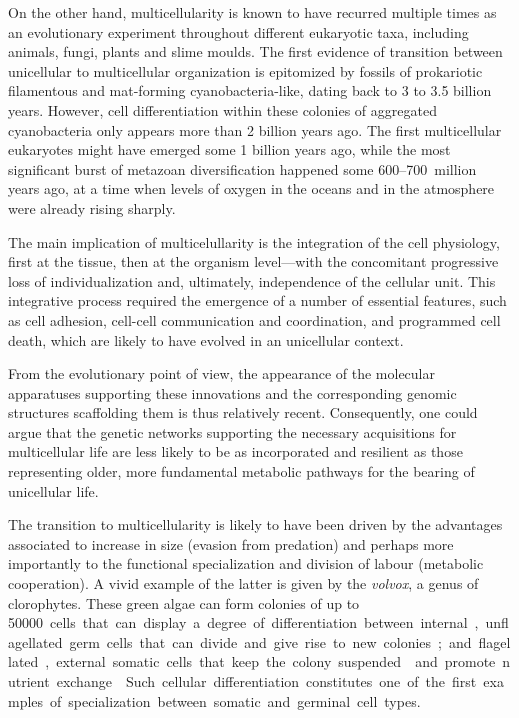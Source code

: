 \documentclass{tufte-book}
\begin{document}

On the other hand, multicellularity is known to have recurred multiple times as
an evolutionary experiment throughout different eukaryotic taxa, including
animals, fungi, plants and slime moulds.\cite{kaiser_building_2001} The first
evidence of transition between unicellular to multicellular organization is
epitomized by fossils of prokariotic filamentous and \mbox{mat-forming}
\mbox{cyanobacteria-like}, dating back to 3 to 3.5 billion
years.\cite{knoll_life_2003,schopf_microfossils_1993} However, cell
differentiation within these colonies of aggregated cyanobacteria only appears
more than 2 billion years ago.\cite{tomitani_evolutionary_2006} The first
multicellular eukaryotes might have emerged some 1 billion years
ago\cite{knoll_eukaryotic_2006}, while the most significant burst of metazoan
diversification happened some \mbox{600--700~million} years ago, at a time when
levels of oxygen in the oceans and in the atmosphere were already rising
sharply.\cite{carroll_chance_2001,king_unicellular_2004}

The main implication of multicelullarity is the integration of the cell
physiology, first at the tissue, then at the organism level---with the
concomitant progressive loss of individualization and, ultimately, independence
of the cellular unit.  This integrative process required the emergence of a
number of essential features, such as cell adhesion, \mbox{cell-cell}
communication and coordination, and programmed cell death, which are likely to
have evolved in an unicellular
context.\cite{bonner_development:_1974,bonner_first_2009,kaiser_building_2001}

From the evolutionary point of view, the appearance of the molecular apparatuses
supporting these innovations and the corresponding genomic structures
scaffolding them is thus relatively recent.  Consequently, one could argue that
the genetic networks supporting the necessary acquisitions for multicellular
life are less likely to be as incorporated and resilient as those representing
older, more fundamental metabolic pathways for the bearing of unicellular life.


The transition to multicellularity is likely to have been driven by the
advantages associated to increase in size (evasion from predation) and perhaps
more importantly to the functional specialization and division of labour
(metabolic cooperation).  A vivid example of the latter is given by the
\emph{volvox}, a genus of clorophytes.  These green algae can form colonies of
up to \SI{50000} cells that can display a degree of differentiation between
internal, unflagellated germ cells that can divide and give rise to new colonies;
and flagellated, external somatic cells that keep the colony
suspended\cite{kirk_volvox:_2005} and promote nutrient
exchange.\cite{solari_multicellularity_2006}  Such cellular differentiation
constitutes one of the first examples of specialization between somatic and
germinal cell types.
\end{document}
